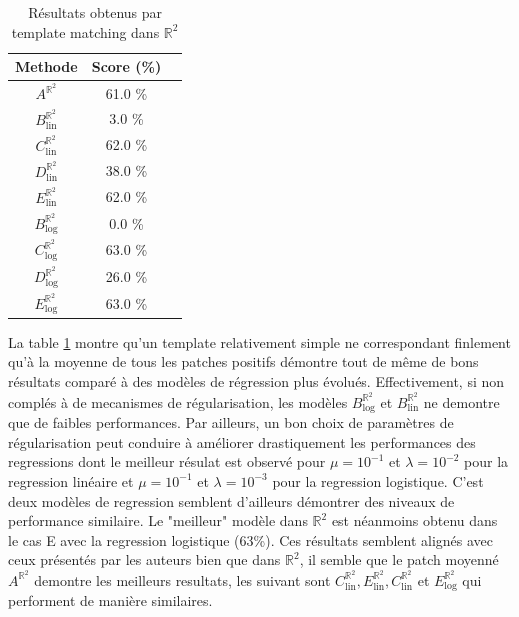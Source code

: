 \documentclass{article}
\begin{document}
\begin{table}[h!]
    \centering
    \begin{tabular}{|c|c|c|}
        \hline
        Methode & Score (\%)\\
        \hline
        \hline
        $A^{\mathbb{R}^2}$& 61.0 \% \\
        \hline
        $B_{\text{lin}}^{\mathbb{R}^2}$& 3.0 \%    \\
        $C_{\text{lin}}^{\mathbb{R}^2}$& 62.0 \%   \\
        $D_{\text{lin}}^{\mathbb{R}^2}$& 38.0 \%   \\
        $E_{\text{lin}}^{\mathbb{R}^2}$& 62.0 \%   \\
        \hline
        $B_{\text{log}}^{\mathbb{R}^2} $& 0.0 \%   \\ 
        $C_{\text{log}}^{\mathbb{R}^2} $& 63.0 \%  \\ 
        $D_{\text{log}}^{\mathbb{R}^2} $& 26.0 \%   \\ 
        $E_{\text{log}}^{\mathbb{R}^2} $& 63.0 \%  \\ 
        \hline
    \end{tabular}
    \caption{Résultats obtenus par template matching dans $\mathbb{R}^2$}
    \label{table: R2}
\end{table}

La table \ref{table: R2} montre qu'un template relativement simple ne correspondant finlement qu'à la moyenne de tous les patches positifs démontre tout de même de bons
résultats comparé à des modèles de régression plus évolués. Effectivement, si non complés à de mecanismes de régularisation, les modèles $B_{\text{log}}^{\mathbb{R}^2} $ et 
$B_{\text{lin}}^{\mathbb{R}^2} $ ne demontre que de faibles performances. Par ailleurs, un bon choix de paramètres de régularisation peut conduire à améliorer drastiquement les 
performances des regressions dont le meilleur résulat est observé pour $\mu = 10^{-1}$ et $\lambda = 10^{-2}$ pour la regression linéaire et $\mu = 10^{-1}$ et $\lambda = 10^{-3}$ pour la regression logistique.
C'est deux modèles de regression semblent d'ailleurs démontrer des niveaux de performance similaire.
Le "meilleur" modèle dans $\mathbb{R}^2$ est néanmoins obtenu dans le cas E avec la regression logistique (63\%). Ces résultats semblent alignés avec ceux présentés par les auteurs bien que dans $\mathbb{R}^2$, 
il semble que le patch moyenné $A^{\mathbb{R}^2}$ demontre les meilleurs resultats, les suivant sont $C_{\text{lin}}^{\mathbb{R}^2}, E_{\text{lin}}^{\mathbb{R}^2}, C_{\text{lin}}^{\mathbb{R}^2}$ et $E_{\text{log}}^{\mathbb{R}^2}$ qui performent de manière 
similaires.
\end{document}
